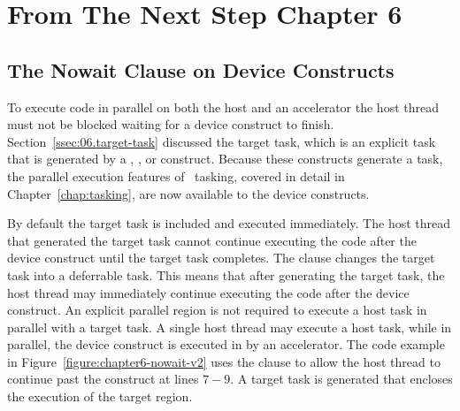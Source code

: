 \section{From The Next Step Chapter 6}

\subsection{The Nowait Clause on Device Constructs}
\label{sec:06.async-exec}


To execute code in parallel on both the host and an
accelerator the host thread must not be blocked waiting for a
device construct to finish.  Section~\ref{ssec:06.target-task} discussed the
target task, which is an explicit task that is generated by a ,
,  or 
construct.  Because these constructs generate a task, the parallel execution
features of \OMP\ tasking, covered in detail in Chapter~\ref{chap:tasking}, are
now available to the device constructs.

By default the target task is included and executed immediately.  The host
thread that generated the target task cannot continue executing the code after
the device construct until the target task completes.  The  clause
changes the target task into a deferrable task.  This means that after
generating the target task, the host thread may immediately continue executing
the code after the device construct.  An explicit parallel region is not
required to execute a host task in parallel with a target task.  A single host
thread may execute a host task, while in parallel, the device construct is executed in
by an accelerator.  The code example in
Figure~\ref{figure:chapter6-nowait-v2} uses the  clause to allow the
host thread to continue past the  construct at lines $7-9$.  A
target task is generated that encloses the execution of the target region.

